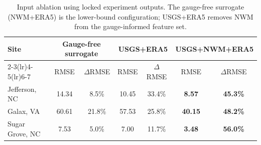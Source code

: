 \begin{table}
\centering
\caption{Input ablation using locked experiment outputs. The gauge-free surrogate (NWM+ERA5) is the lower-bound configuration; USGS+ERA5 removes NWM from the gauge-informed feature set.}
\small
\begin{tabular}{l cc cc cc}
\toprule
\textbf{Site} & \multicolumn{2}{c}{\textbf{Gauge-free surrogate}} & \multicolumn{2}{c}{\textbf{USGS+ERA5}} & \multicolumn{2}{c}{\textbf{USGS+NWM+ERA5}} \\
\cmidrule(lr){2-3}\cmidrule(lr){4-5}\cmidrule(lr){6-7}
 & RMSE & $\Delta$RMSE & RMSE & $\Delta$RMSE & RMSE & $\Delta$RMSE \\
\midrule
Jefferson, NC & 14.34 & 8.5\% & 10.45 & 33.4\% & \textbf{8.57} & \textbf{45.3\%} \\
Galax, VA & 60.61 & 21.8\% & 57.53 & 25.8\% & \textbf{40.15} & \textbf{48.2\%} \\
Sugar Grove, NC & 7.53 & 5.0\% & 7.00 & 11.7\% & \textbf{3.48} & \textbf{56.0\%} \\
\bottomrule
\end{tabular}
\label{tab:input_ablation}
\end{table}
